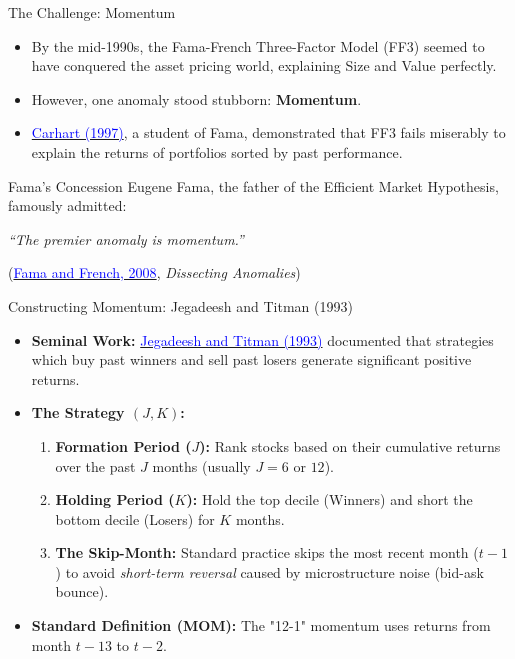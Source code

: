 \documentclass{beamer}
\begin{document}
\begin{frame}{The Challenge: Momentum}
	\begin{itemize}
		\item By the mid-1990s, the Fama-French Three-Factor Model (FF3) seemed to have conquered the asset pricing world, explaining Size and Value perfectly.
		\item However, one anomaly stood stubborn: \textbf{Momentum}.
		\item \href{https://doi.org/10.1111/j.1540-6261.1997.tb03808.x}{\textcolor{blue}{Carhart (1997)}}, a student of Fama, demonstrated that FF3 fails miserably to explain the returns of portfolios sorted by past performance.
	\end{itemize}
	
	\vspace{0.3cm}
	\begin{block}{Fama's Concession}
		Eugene Fama, the father of the Efficient Market Hypothesis, famously admitted:
		\begin{center}
			\textit{``The premier anomaly is momentum.''}
		\end{center}
		\footnotesize (\href{https://doi.org/10.1111/j.1540-6261.2008.01371.x}{\textcolor{blue}{Fama and French, 2008}}, \textit{Dissecting Anomalies})
	\end{block}
\end{frame}

\begin{frame}{Constructing Momentum: Jegadeesh and Titman (1993)}
	\begin{itemize}
		\item \textbf{Seminal Work:} \href{https://doi.org/10.1111/j.1540-6261.1993.tb04702.x}{\textcolor{blue}{Jegadeesh and Titman (1993)}} documented that strategies which buy past winners and sell past losers generate significant positive returns.
		\item \textbf{The Strategy $(J, K)$:}
		\begin{enumerate}
			\item \textbf{Formation Period ($J$):} Rank stocks based on their cumulative returns over the past $J$ months (usually $J=6$ or $12$).
			\item \textbf{Holding Period ($K$):} Hold the top decile (Winners) and short the bottom decile (Losers) for $K$ months.
			\item \textbf{The Skip-Month:} Standard practice skips the most recent month ($t-1$) to avoid \textit{short-term reversal} caused by microstructure noise (bid-ask bounce).
		\end{enumerate}
		\item \textbf{Standard Definition (MOM):} The "12-1" momentum uses returns from month $t-13$ to $t-2$.
	\end{itemize}
\end{frame}
\end{document}
